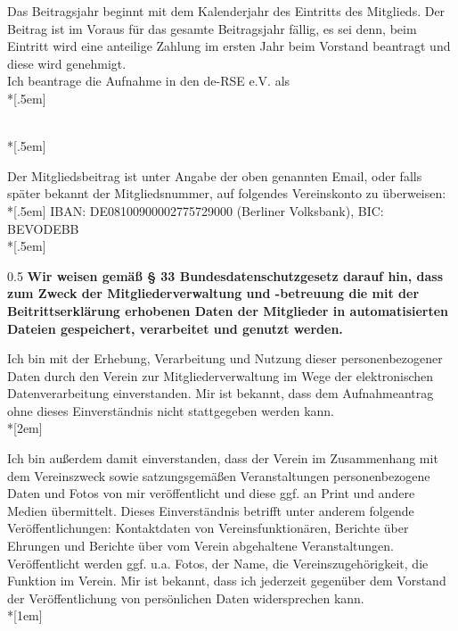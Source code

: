 \documentclass[../Vorlagen/de-RSE_Kopf,a4paper]{scrlttr2}
\begin{document}
\begin{letter}{}
Das Beitragsjahr beginnt mit dem Kalenderjahr des Eintritts des Mitglieds. Der Beitrag ist im Voraus für das gesamte Beitragsjahr fällig, es sei denn, beim Eintritt wird eine anteilige Zahlung im ersten Jahr beim Vorstand beantragt und diese wird genehmigt.\\

%
Ich beantrage die Aufnahme in den de-RSE e.V. als\\*[.5em]
\begin{Form}
\\*[.5em]
\end{Form}

Der Mitgliedsbeitrag ist unter Angabe der oben genannten Email, oder falls später bekannt der Mitgliedsnummer, auf folgendes Vereinskonto zu überweisen:\\*[.5em]
IBAN: DE08100900002775729000 (Berliner Volksbank), BIC: BEVODEBB\\*[.5em]

\clearpage

\begin{spacing}{0.5}
\textbf{
Wir weisen gemäß § 33 Bundesdatenschutzgesetz darauf hin, dass zum Zweck der Mitgliederverwaltung und -betreuung die mit der Beitrittserklärung erhobenen Daten der Mitglieder in automatisierten Dateien gespeichert, verarbeitet und genutzt werden.}

Ich bin mit der Erhebung, Verarbeitung und Nutzung dieser personenbezogener Daten durch den Verein zur Mitgliederverwaltung im Wege der elektronischen Datenverarbeitung einverstanden.
Mir ist bekannt, dass dem Aufnahmeantrag ohne dieses Einverständnis nicht stattgegeben werden kann.\\*[2em]
\end{spacing}

Ich bin außerdem damit einverstanden, dass der Verein im Zusammenhang mit dem Vereinszweck sowie satzungsgemäßen Veranstaltungen personenbezogene Daten und Fotos von mir veröffentlicht und diese ggf. an Print und andere Medien übermittelt.
Dieses Einverständnis betrifft unter anderem folgende Veröffentlichungen: Kontaktdaten von Vereinsfunktionären, Berichte über Ehrungen und Berichte über vom Verein abgehaltene Veranstaltungen.
Veröffentlicht werden ggf. u.a. Fotos, der Name, die Vereinszugehörigkeit, die Funktion im Verein.
Mir ist bekannt, dass ich jederzeit gegenüber dem Vorstand der Veröffentlichung von persönlichen Daten widersprechen kann.\\*[1em]


\end{letter}
\end{document}
